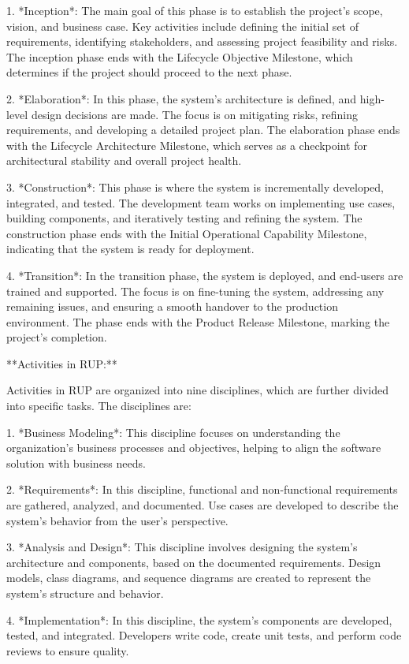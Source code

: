 \documentclass{article}
\begin{document}
1. *Inception*: The main goal of this phase is to establish the project's scope, vision, and business case. Key activities include defining the initial set of requirements, identifying stakeholders, and assessing project feasibility and risks. The inception phase ends with the Lifecycle Objective Milestone, which determines if the project should proceed to the next phase.

2. *Elaboration*: In this phase, the system's architecture is defined, and high-level design decisions are made. The focus is on mitigating risks, refining requirements, and developing a detailed project plan. The elaboration phase ends with the Lifecycle Architecture Milestone, which serves as a checkpoint for architectural stability and overall project health.

3. *Construction*: This phase is where the system is incrementally developed, integrated, and tested. The development team works on implementing use cases, building components, and iteratively testing and refining the system. The construction phase ends with the Initial Operational Capability Milestone, indicating that the system is ready for deployment.

4. *Transition*: In the transition phase, the system is deployed, and end-users are trained and supported. The focus is on fine-tuning the system, addressing any remaining issues, and ensuring a smooth handover to the production environment. The phase ends with the Product Release Milestone, marking the project's completion.

**Activities in RUP:**

Activities in RUP are organized into nine disciplines, which are further divided into specific tasks. The disciplines are:

1. *Business Modeling*: This discipline focuses on understanding the organization's business processes and objectives, helping to align the software solution with business needs.

2. *Requirements*: In this discipline, functional and non-functional requirements are gathered, analyzed, and documented. Use cases are developed to describe the system's behavior from the user's perspective.

3. *Analysis and Design*: This discipline involves designing the system's architecture and components, based on the documented requirements. Design models, class diagrams, and sequence diagrams are created to represent the system's structure and behavior.

4. *Implementation*: In this discipline, the system's components are developed, tested, and integrated. Developers write code, create unit tests, and perform code reviews to ensure quality.
\end{document}
